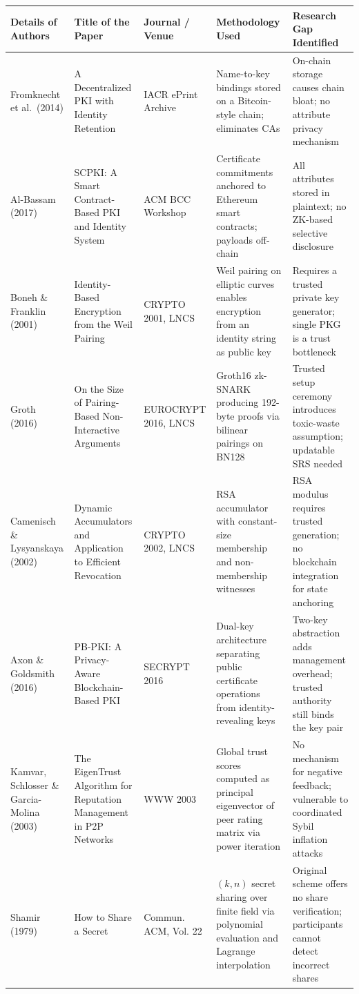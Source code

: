 \documentclass[12pt,a4paper]{article}
\begin{document}
\vspace{0.3cm}
\renewcommand{\arraystretch}{1.5}
\begin{tabularx}{\textwidth}{|>{\centering\arraybackslash}p{2.4cm}|>{\centering\arraybackslash}p{2.8cm}|>{\centering\arraybackslash}p{2.2cm}|>{\centering\arraybackslash}X|>{\centering\arraybackslash}X|}
\hline
\textbf{\small Details of Authors} & \textbf{\small Title of the Paper} & \textbf{\small Journal / Venue} & \textbf{\small Methodology Used} & \textbf{\small Research Gap Identified} \\
\hline
Fromknecht et al.\ (2014) &
A Decentralized PKI with Identity Retention &
IACR ePrint Archive &
Name-to-key bindings stored on a Bitcoin-style chain; eliminates CAs &
On-chain storage causes chain bloat; no attribute privacy mechanism \\
\hline
Al-Bassam (2017) &
SCPKI: A Smart Contract-Based PKI and Identity System &
ACM BCC Workshop &
Certificate commitments anchored to Ethereum smart contracts; payloads off-chain &
All attributes stored in plaintext; no ZK-based selective disclosure \\
\hline
Boneh \& Franklin (2001) &
Identity-Based Encryption from the Weil Pairing &
CRYPTO 2001, LNCS &
Weil pairing on elliptic curves enables encryption from an identity string as public key &
Requires a trusted private key generator; single PKG is a trust bottleneck \\
\hline
Groth (2016) &
On the Size of Pairing-Based Non-Interactive Arguments &
EUROCRYPT 2016, LNCS &
Groth16 zk-SNARK producing 192-byte proofs via bilinear pairings on BN128 &
Trusted setup ceremony introduces toxic-waste assumption; updatable SRS needed \\
\hline
Camenisch \& Lysyanskaya (2002) &
Dynamic Accumulators and Application to Efficient Revocation &
CRYPTO 2002, LNCS &
RSA accumulator with constant-size membership and non-membership witnesses &
RSA modulus requires trusted generation; no blockchain integration for state anchoring \\
\hline
Axon \& Goldsmith (2016) &
PB-PKI: A Privacy-Aware Blockchain-Based PKI &
SECRYPT 2016 &
Dual-key architecture separating public certificate operations from identity-revealing keys &
Two-key abstraction adds management overhead; trusted authority still binds the key pair \\
\hline
Kamvar, Schlosser \& Garcia-Molina (2003) &
The EigenTrust Algorithm for Reputation Management in P2P Networks &
WWW 2003 &
Global trust scores computed as principal eigenvector of peer rating matrix via power iteration &
No mechanism for negative feedback; vulnerable to coordinated Sybil inflation attacks \\
\hline
Shamir (1979) &
How to Share a Secret &
Commun. ACM, Vol. 22 &
$(k,n)$ secret sharing over finite field via polynomial evaluation and Lagrange interpolation &
Original scheme offers no share verification; participants cannot detect incorrect shares \\
\hline
\end{tabularx}
\end{document}
